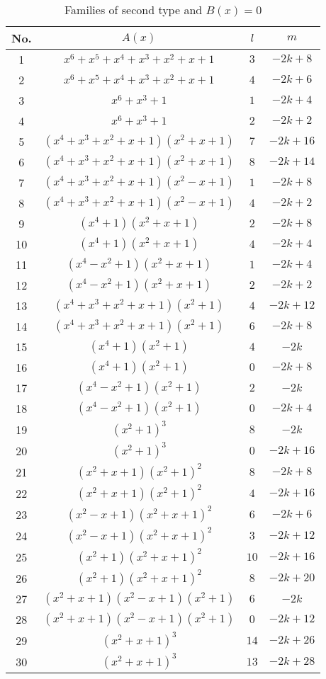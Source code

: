 \documentclass{amsart}
\begin{document}
\begin{table}[ht]
\caption{Families of second type and $B(x)=0$}
\centering
\begin{tabular}{|c |c |c |c |}
\hline
No. & $A(x)$ & $l$ & $m$\\
\hline
1 & $x^6+x^5+x^4+x^3+x^2+x+1$ & $3$ & $-2k+8$  \\
2 & $x^6+x^5+x^4+x^3+x^2+x+1$ & $4$ & $-2k+6$  \\
3 & $x^6+x^3+1$ & $1$ & $-2k+4$  \\
4 & $x^6+x^3+1$ & $2$ & $-2k+2$  \\
5 & $(x^4+x^3+x^2+x+1)(x^2+x+1)$ & $7$ & $-2k+16$  \\
6 & $(x^4+x^3+x^2+x+1)(x^2+x+1)$ & $8$ & $-2k+14$  \\
7 & $(x^4+x^3+x^2+x+1)(x^2-x+1)$ & $1 $ & $-2k+8$  \\
8 & $(x^4+x^3+x^2+x+1)(x^2-x+1)$ & $4 $ & $-2k+2$  \\
9 & $(x^4+1)(x^2+x+1)$ & $ 2 $ & $-2k+ 8$  \\
10 & $(x^4+1)(x^2+x+1)$ & $ 4 $ & $-2k+ 4$  \\
11 & $(x^4-x^2+1)(x^2+x+1)$ & $ 1 $ & $-2k+ 4$  \\
12 & $(x^4-x^2+1)(x^2+x+1)$ & $ 2 $ & $-2k+ 2$  \\
13 & $(x^4+x^3+x^2+x+1)(x^2+1)$ & $ 4 $ & $-2k+ 12$  \\
14 & $(x^4+x^3+x^2+x+1)(x^2+1)$ & $ 6 $ & $-2k+ 8$  \\
15 & $(x^4+1)(x^2+1)$ & $ 4 $ & $-2k$  \\
16 & $(x^4+1)(x^2+1)$ & $ 0 $ & $-2k+ 8$  \\
17 & $(x^4-x^2+1)(x^2+1)$ & $ 2 $ & $-2k$  \\
18 & $(x^4-x^2+1)(x^2+1)$ & $ 0 $ & $-2k + 4$  \\
19 & $(x^2+1)^3$ & $ 8 $ & $-2k$  \\
20 & $(x^2+1)^3$ & $ 0 $ & $-2k + 16$  \\
21 & $(x^2+x+1)(x^2+1)^2$ & $ 8 $ & $-2k + 8$  \\
22 & $(x^2+x+1)(x^2+1)^2$ & $ 4 $ & $-2k + 16$  \\
23 & $(x^2-x+1)(x^2+x+1)^2$ & $ 6 $ & $-2k + 6$  \\
24 & $(x^2-x+1)(x^2+x+1)^2$ & $ 3 $ & $-2k + 12$  \\
25 & $(x^2+1)(x^2+x+1)^2$ & $ 10 $ & $-2k + 16$  \\
26 & $(x^2+1)(x^2+x+1)^2$ & $ 8 $ & $-2k + 20$  \\
27 & $(x^2+x+1)(x^2-x+1)(x^2+1)$ & $ 6 $ & $-2k$  \\
28 & $(x^2+x+1)(x^2-x+1)(x^2+1)$ & $ 0 $ & $-2k + 12$  \\
29 & $(x^2+x+1)^3$ & $ 14 $ & $-2k + 26$  \\
30 & $(x^2+x+1)^3$ & $ 13 $ & $-2k + 28$  \\
\hline
\end{tabular}
\end{table}
\end{document}
